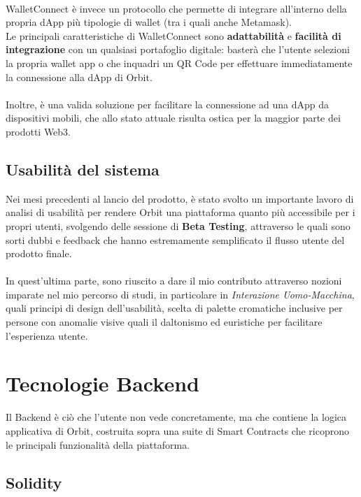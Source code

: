\documentclass[12pt,a4paper]{report}
\begin{document}
\noindent \\WalletConnect è invece un protocollo che permette di integrare all'interno della propria dApp più tipologie di wallet (tra i quali anche Metamask).\\Le principali caratteristiche di WalletConnect sono \textbf{adattabilità} e \textbf{facilità di integrazione} con un qualsiasi portafoglio digitale: basterà che l'utente selezioni la propria wallet app o che inquadri un QR Code per effettuare immediatamente la connessione alla dApp di Orbit. 
\\\\Inoltre, è una valida soluzione per facilitare la connessione ad una dApp da dispositivi mobili, che allo stato attuale risulta ostica per la maggior parte dei prodotti Web3.

\subsection{Usabilità del sistema}

Nei mesi precedenti al lancio del prodotto, è stato svolto un importante lavoro di analisi di usabilità per rendere Orbit una piattaforma quanto più accessibile per i propri utenti, svolgendo delle sessione di \textbf{Beta Testing}, attraverso le quali sono sorti dubbi e feedback che hanno estremamente semplificato il flusso utente del prodotto finale. 
\\\\In quest'ultima parte, sono riuscito a dare il mio contributo attraverso nozioni imparate nel mio percorso di studi, in particolare in \textit{Interazione Uomo-Macchina}, quali principi di design dell'usabilità, scelta di palette cromatiche inclusive per persone con anomalie visive quali il daltonismo ed euristiche per facilitare l'esperienza utente.  

\section{Tecnologie Backend}

Il Backend è ciò che l'utente non vede concretamente, ma che contiene la logica applicativa di Orbit, costruita sopra una suite di Smart Contracts che ricoprono le principali funzionalità della piattaforma.

\subsection{Solidity}
\end{document}
